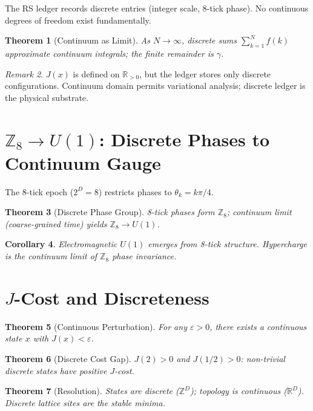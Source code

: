 \documentclass[12pt,a4paper]{article}
\newtheorem{theorem}{Theorem}[section]
\newtheorem{corollary}[theorem]{Corollary}
\theoremstyle{definition}
\theoremstyle{remark}
\newtheorem{remark}[theorem]{Remark}
\begin{document}
The RS ledger records discrete entries (integer scale, 8-tick phase).
No continuous degrees of freedom exist fundamentally.

\begin{theorem}[Continuum as Limit]
As $N \to \infty$, discrete sums $\sum_{k=1}^N f(k)$ approximate
continuum integrals; the finite remainder is $\gamma$.
\end{theorem}

\begin{remark}
$J(x)$ is defined on $\mathbb{R}_{>0}$, but the ledger stores only
discrete configurations.  Continuum domain permits variational
analysis; discrete ledger is the physical substrate.
\end{remark}

\section{$\mathbb{Z}_8 \to U(1)$: Discrete Phases to Continuum Gauge}
\label{sec:z8-u1}

The 8-tick epoch ($2^D = 8$) restricts phases to $\theta_k = k\pi/4$.

\begin{theorem}[Discrete Phase Group]
8-tick phases form $\mathbb{Z}_8$; continuum limit (coarse-grained
time) yields $\mathbb{Z}_8 \to U(1)$.
\end{theorem}

\begin{corollary}
Electromagnetic $U(1)$ emerges from 8-tick structure.  Hypercharge is
the continuum limit of $\mathbb{Z}_8$ phase invariance.
\end{corollary}

\section{$J$-Cost and Discreteness}
\label{sec:j-cost}

\begin{theorem}[Continuous Perturbation]
For any $\varepsilon > 0$, there exists a continuous state $x$ with
$J(x) < \varepsilon$.
\end{theorem}

\begin{theorem}[Discrete Cost Gap]
$J(2) > 0$ and $J(1/2) > 0$: non-trivial discrete states have positive
$J$-cost.
\end{theorem}

\begin{theorem}[Resolution]
States are discrete ($\mathbb{Z}^D$); topology is continuous
($\mathbb{R}^D$).  Discrete lattice sites are the stable minima.
\end{theorem}
\end{document}
